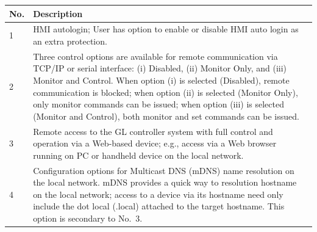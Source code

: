 \begin{longtable}[]{@{}|l|l|@{}}
\toprule
\rowcolor{brown}\begin{minipage}[b]{0.07\columnwidth}\raggedright
{\bf{No.}}\strut
\end{minipage} & \begin{minipage}[b]{0.88\columnwidth}\raggedright
{\bf{Description}}\strut
\end{minipage}\tabularnewline
\midrule
\endhead
\begin{minipage}[t]{0.07\columnwidth}\raggedright
1\strut
\end{minipage} & \begin{minipage}[t]{0.88\columnwidth}\raggedright
HMI autologin; User has option to enable or disable HMI auto login as an
extra protection.\strut
\end{minipage}\tabularnewline
\begin{minipage}[t]{0.07\columnwidth}\raggedright
2\strut
\end{minipage} & \begin{minipage}[t]{0.88\columnwidth}\raggedright
Three control options are available for remote communication via TCP/IP
or serial interface: (i) Disabled, (ii) Monitor Only, and (iii) Monitor
and Control. When option (i) is selected (Disabled), remote
communication is blocked; when option (ii) is selected (Monitor Only),
only monitor commands can be issued; when option (iii) is selected
(Monitor and Control), both monitor and set commands can be
issued.\strut
\end{minipage}\tabularnewline
\begin{minipage}[t]{0.07\columnwidth}\raggedright
3\strut
\end{minipage} & \begin{minipage}[t]{0.88\columnwidth}\raggedright
Remote access to the GL controller system with full control and
operation via a Web-based device; e.g., access via a Web browser running
on PC or handheld device on the local network.\strut
\end{minipage}\tabularnewline
\begin{minipage}[t]{0.07\columnwidth}\raggedright
4\strut
\end{minipage} & \begin{minipage}[t]{0.88\columnwidth}\raggedright
Configuration options for Multicast DNS (mDNS) name resolution on the
local network. mDNS provides a quick way to resolution hostname on the
local network; access to a device via its hostname need only include the
dot local (.local) attached to the target hostname. This option is
secondary to No.~3.\strut
\end{minipage}\tabularnewline
\bottomrule
\end{longtable}

